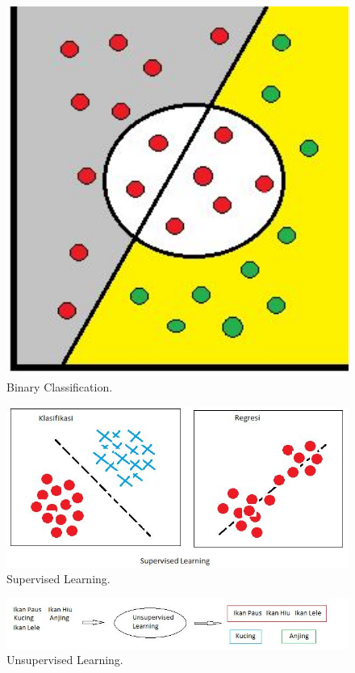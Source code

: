 \begin{figure}[ht]
		\centerline{\includegraphics[width=1\textwidth]{figures/huda/binary.JPG}}
		\caption{Binary Classification.}
		\label{1}
\end{figure}
\begin{figure}[ht]
		\centerline{\includegraphics[width=1\textwidth]{figures/huda/supervised.JPG}}
		\caption{Supervised Learning.}
		\label{2}
\end{figure}
\begin{figure}[ht]
		\centerline{\includegraphics[width=1\textwidth]{figures/huda/unsupervised.JPG}}
		\caption{Unsupervised Learning.}
		\label{3}
\end{figure}

